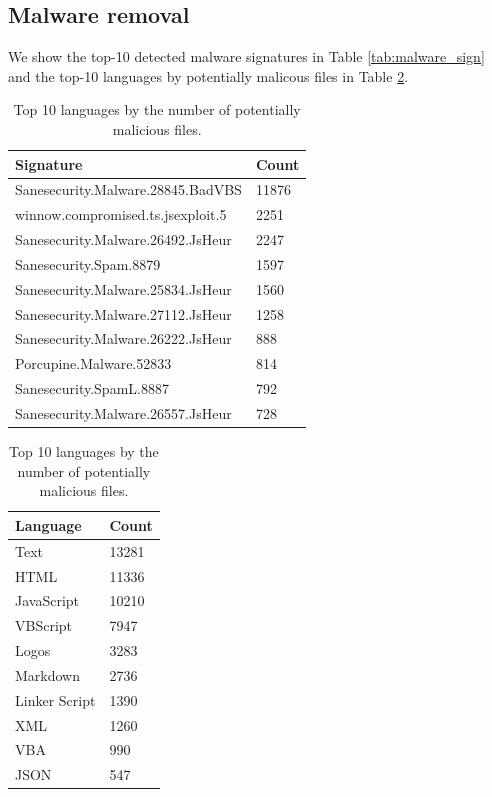 \documentclass[10pt]{article} %
\begin{document}
\subsection{Malware removal}
We show the top-10 detected malware signatures in Table \ref{tab:malware_sign} and the top-10 languages by potentially malicous files in Table \ref{tab:malware_lang}. 
\begin{table}[t]
\begin{minipage}[t]{0.45\linewidth}
\caption{Top 10 detected malware signatures.}
\label{tab:malware_sign}
\centering
\begin{tabular}{ll}
\toprule
\textbf{Signature} & \textbf{Count} \\
\midrule
Sanesecurity.Malware.28845.BadVBS & 11876 \\
winnow.compromised.ts.jsexploit.5 & 2251 \\
Sanesecurity.Malware.26492.JsHeur & 2247 \\
Sanesecurity.Spam.8879 & 1597 \\
Sanesecurity.Malware.25834.JsHeur & 1560 \\
Sanesecurity.Malware.27112.JsHeur & 1258 \\
Sanesecurity.Malware.26222.JsHeur & 888 \\
Porcupine.Malware.52833 & 814 \\
Sanesecurity.SpamL.8887 & 792 \\
Sanesecurity.Malware.26557.JsHeur & 728 \\
\bottomrule
\end{tabular}
\end{minipage}%
\hfill%
\begin{minipage}[t]{0.45\linewidth}
\caption{Top 10 languages by the number of potentially malicious files.}
\label{tab:malware_lang}
\centering
\begin{tabular}{ll}
\toprule
\textbf{Language} & \textbf{Count} \\
\midrule
Text & 13281 \\
HTML & 11336 \\
JavaScript & 10210 \\
VBScript & 7947 \\
Logos & 3283 \\
Markdown & 2736 \\
Linker Script & 1390 \\
XML & 1260 \\
VBA & 990 \\
JSON & 547 \\
\bottomrule
\end{tabular}
\end{minipage}
\end{table}
\end{document}
